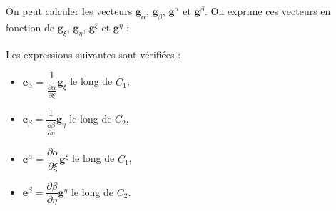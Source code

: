 On peut calculer les vecteurs $\mathbf{g}_{\alpha}$, $\mathbf{g}_{\beta}$, $\mathbf{g}^{\alpha}$ et $\mathbf{g}^{\beta}$. On exprime ces vecteurs en fonction de $\mathbf{g}_{\xi}$, $\mathbf{g}_{\eta}$, $\mathbf{g}^{\xi}$ et $\mathbf{g}^{\eta}$ :

\begin{proposition}
Les expressions suivantes sont vérifiées :
\begin{itemize}
\item $\mathbf{e}_{\alpha} = \dfrac{1}{\frac{\partial \alpha}{\partial \xi}} \mathbf{g}_{\xi}$ le long de $C_1$,
\item $\mathbf{e}_{\beta} = \dfrac{1}{\frac{\partial \beta}{\partial \eta}} \mathbf{g}_{\eta}$ le long de $C_2$,
\item $\mathbf{e}^{\alpha} = \dfrac{\partial \alpha}{\partial \xi} \mathbf{g}^{\xi}$ le long de $C_1$,
\item $\mathbf{e}^{\beta} = \dfrac{\partial \beta}{\partial \eta} \mathbf{g}^{\eta}$ le long de $C_2$.
\end{itemize}
\label{prop: g_alpha g_beta fct de g_xi g_eta}
\end{proposition}

